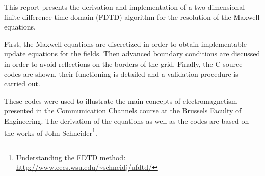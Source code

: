 This report presents the derivation and implementation of a two dimensional finite-difference time-domain (FDTD) algorithm for the resolution of the Maxwell equations. 

First, the Maxwell equations are discretized in order to obtain implementable update equations for the fields. Then advanced boundary conditions are discussed in order to avoid reflections on the borders of the grid. Finally, the C source codes are shown, their functioning is detailed and a validation procedure is carried out.

These codes were used to illustrate the main concepts of electromagnetism presented in the Communication Channels course at the Brussels Faculty of Engineering. The derivation of the equations as well as the codes are based on the works of John Schneider\footnote{Understanding the FDTD method: \url{http://www.eecs.wsu.edu/~schneidj/ufdtd/}\label{fn}}.